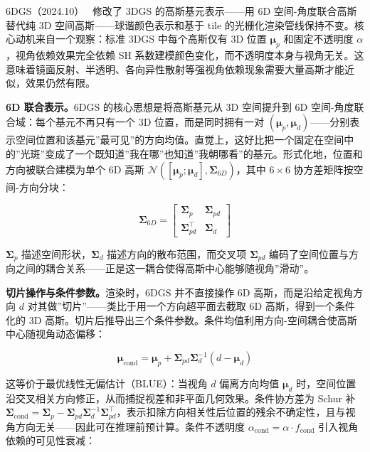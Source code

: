 6DGS（2024.10）~\cite{2410_04974} 修改了 3DGS 的高斯基元表示——用 6D 空间-角度联合高斯替代纯 3D 空间高斯——球谐颜色表示和基于 tile 的光栅化渲染管线保持不变。核心动机来自一个观察：标准 3DGS 中每个高斯仅有 3D 位置 $\boldsymbol{\mu}_p$ 和固定不透明度 $\alpha$，视角依赖效果完全依赖 SH 系数建模颜色变化，而不透明度本身与视角无关。这意味着镜面反射、半透明、各向异性散射等强视角依赖现象需要大量高斯才能近似，效果仍然有限。

\textbf{6D 联合表示。}6DGS 的核心思想是将高斯基元从 3D 空间提升到 6D 空间-角度联合域：每个基元不再只有一个 3D 位置，而是同时拥有一对 $(\boldsymbol{\mu}_p, \boldsymbol{\mu}_d)$——分别表示空间位置和该基元”最可见”的方向均值。直觉上，这好比把一个固定在空间中的”光斑”变成了一个既知道”我在哪”也知道”我朝哪看”的基元。形式化地，位置和方向被联合建模为单个 6D 高斯 $\mathcal{N}([\boldsymbol{\mu}_p; \boldsymbol{\mu}_d], \boldsymbol{\Sigma}_{6D})$，其中 $6\times6$ 协方差矩阵按空间-方向分块：

\begin{equation}
\boldsymbol{\Sigma}_{6D} = \begin{bmatrix} \boldsymbol{\Sigma}_p & \boldsymbol{\Sigma}_{pd} \\ \boldsymbol{\Sigma}_{pd}^\top & \boldsymbol{\Sigma}_d \end{bmatrix}
\end{equation}

$\boldsymbol{\Sigma}_p$ 描述空间形状，$\boldsymbol{\Sigma}_d$ 描述方向的散布范围，而交叉项 $\boldsymbol{\Sigma}_{pd}$ 编码了空间位置与方向之间的耦合关系——正是这一耦合使得高斯中心能够随视角”滑动”。

\textbf{切片操作与条件参数。}渲染时，6DGS 并不直接操作 6D 高斯，而是沿给定视角方向 $d$ 对其做”切片”——类比于用一个方向超平面去截取 6D 高斯，得到一个条件化的 3D 高斯。切片后推导出三个条件参数。条件均值利用方向-空间耦合使高斯中心随视角动态偏移：

\begin{equation}
\boldsymbol{\mu}_\text{cond} = \boldsymbol{\mu}_p + \boldsymbol{\Sigma}_{pd}\boldsymbol{\Sigma}_d^{-1}(d - \boldsymbol{\mu}_d)
\end{equation}

这等价于最优线性无偏估计（BLUE）：当视角 $d$ 偏离方向均值 $\boldsymbol{\mu}_d$ 时，空间位置沿交叉相关方向修正，从而捕捉视差和非平面几何效果。条件协方差为 Schur 补 $\boldsymbol{\Sigma}_\text{cond} = \boldsymbol{\Sigma}_p - \boldsymbol{\Sigma}_{pd}\boldsymbol{\Sigma}_d^{-1}\boldsymbol{\Sigma}_{pd}^\top$，表示扣除方向相关性后位置的残余不确定性，且与视角方向无关——因此可在推理前预计算。条件不透明度 $\alpha_\text{cond} = \alpha \cdot f_\text{cond}$ 引入视角依赖的可见性衰减：


